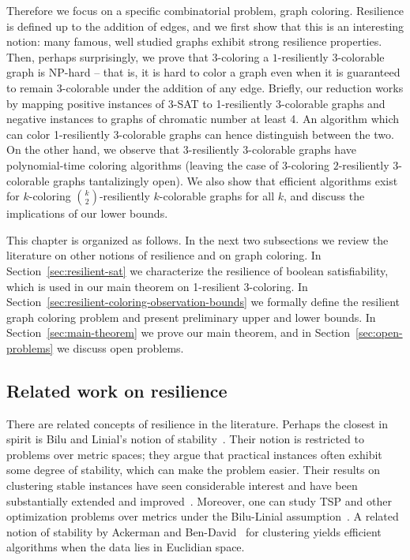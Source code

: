 Therefore we focus on a specific combinatorial problem, graph coloring.
Resilience is defined up to the addition of edges, and we first show that this
is an interesting notion: many famous, well studied graphs exhibit strong
resilience properties. Then, perhaps surprisingly, we prove that $3$-coloring a
$1$-resiliently 3-colorable graph is NP-hard -- that is, it is hard to color a
graph even when it is guaranteed to remain $3$-colorable under the addition of
any edge. Briefly, our reduction works by mapping positive instances of 3-SAT
to 1-resiliently 3-colorable graphs and negative instances to graphs of
chromatic number at least 4. An algorithm which can color 1-resiliently
3-colorable graphs can hence distinguish between the two. On the other hand, we
observe that $3$-resiliently $3$-colorable graphs have polynomial-time coloring
algorithms (leaving the case of 3-coloring $2$-resiliently $3$-colorable graphs
tantalizingly open). We also show that efficient algorithms exist for
$k$-coloring $\binom{k}{2}$-resiliently $k$-colorable graphs for all $k$, and
discuss the implications of our lower bounds. 

This chapter is organized as follows. In the next two subsections we review the
literature on other notions of resilience and on graph coloring. In
Section~\ref{sec:resilient-sat} we characterize the resilience of boolean
satisfiability, which is used in our main theorem on 1-resilient 3-coloring. In
Section~\ref{sec:resilient-coloring-observation-bounds} we formally define the
resilient graph coloring problem and present preliminary upper and lower
bounds. In Section~\ref{sec:main-theorem} we prove our main theorem, and in
Section~\ref{sec:open-problems} we discuss open problems.


\subsection{Related work on resilience}

There are related concepts of resilience in the literature. Perhaps the closest
in spirit is Bilu and Linial's notion of stability~\cite{BL12}.  Their notion
is restricted to problems over metric spaces; they argue that practical
instances often exhibit some degree of stability, which can make the problem
easier.  Their results on clustering stable instances have seen considerable
interest and have been substantially extended and
improved~\cite{ABS10,BenDavidR14,BL12}. Moreover, one can study TSP and other
optimization problems over metrics under the Bilu-Linial
assumption~\cite{MSSW11}.  A related notion of stability by Ackerman and
Ben-David~\cite{AckermanB09} for clustering yields efficient algorithms when
the data lies in Euclidian space.

